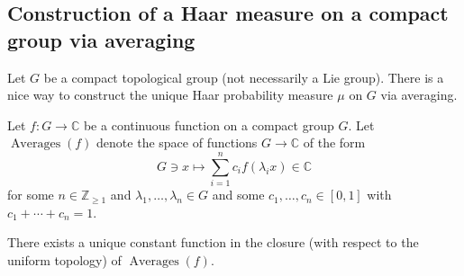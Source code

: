 \documentclass[reqno]{amsart} 
\begin{document}
\subsection{Construction of a Haar measure on a compact group via averaging\label{sec:haar-compact-gp-via-avg}}
\label{sec:org0bc8f8b}
Let $G$ be a compact topological group
(not necessarily a Lie group).
There is a nice way to construct the unique Haar
probability measure $\mu$ on $G$ via averaging.
\begin{definition}
  Let $f : G \rightarrow \mathbb{C}$ be a continuous
  function on a compact group $G$.
  Let $\operatorname{Averages}(f)$ denote the space
  of functions $G \rightarrow \mathbb{C}$
  of the form
  \begin{equation*}
    G \ni x \mapsto
    \sum_{i=1}^n
    c_i
    f(\lambda_i x) \in \mathbb{C}
  \end{equation*}
  for some $n \in \mathbb{Z}_{\geq 1}$
  and $\lambda_1,\dotsc,\lambda_n \in G$
  and some $c_1,\dotsc,c_n \in [0,1]$
  with $c_1 + \dotsb + c_n = 1$.
\end{definition}
\begin{lemma}\label{lem:averages-give-unique-constant}
  There exists a unique constant function
  in the closure (with respect to the uniform
  topology) of $\operatorname{Averages}(f)$.
\end{lemma}
\end{document}

